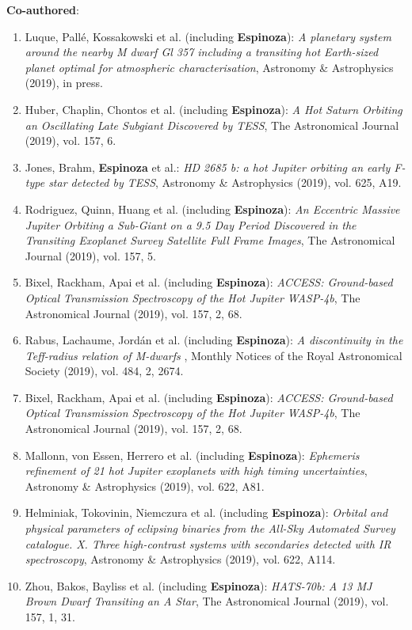 \documentclass[12pt, a4paper]{article} %
\begin{document}
\begin{flushleft}
\textbf{Co-authored}:
\begin{enumerate}
\setlength\itemsep{0.05cm}
\item Luque, Pall\'e, Kossakowski et al. (including \textbf{Espinoza}): \textit{A planetary system around the nearby M dwarf Gl 357 including a transiting hot Earth-sized planet optimal for atmospheric characterisation}, Astronomy \& Astrophysics (2019), in press.
\item Huber, Chaplin, Chontos et al. (including \textbf{Espinoza}): \textit{A Hot Saturn Orbiting an Oscillating Late Subgiant Discovered by TESS}, The Astronomical Journal (2019), vol. 157, 6.
\item Jones, Brahm, \textbf{Espinoza} et al.: \textit{HD 2685 b: a hot Jupiter orbiting an early F-type star detected by TESS}, Astronomy \& Astrophysics (2019), vol. 625, A19.
\item Rodriguez, Quinn, Huang et al. (including \textbf{Espinoza}): \textit{An Eccentric Massive Jupiter Orbiting a Sub-Giant on a 9.5 Day Period Discovered in the Transiting Exoplanet Survey Satellite Full Frame Images}, The Astronomical Journal (2019), vol. 157, 5.
\item Bixel, Rackham, Apai et al. (including \textbf{Espinoza}): \textit{ACCESS: Ground-based Optical Transmission Spectroscopy of the Hot Jupiter WASP-4b}, The Astronomical Journal (2019), vol. 157, 2, 68.
\item Rabus, Lachaume, Jord\'an et al. (including \textbf{Espinoza}): \textit{A discontinuity in the Teff-radius relation of M-dwarfs
}, Monthly Notices of the Royal Astronomical Society (2019), vol. 484, 2, 2674.
\item Bixel, Rackham, Apai et al. (including \textbf{Espinoza}): \textit{ACCESS: Ground-based Optical Transmission Spectroscopy of the Hot Jupiter WASP-4b}, The Astronomical Journal (2019), vol. 157, 2, 68.
\item Mallonn, von Essen, Herrero et al. (including \textbf{Espinoza}): \textit{Ephemeris refinement of 21 hot Jupiter exoplanets with high timing uncertainties}, Astronomy \& Astrophysics (2019), vol. 622, A81.
\item Helminiak, Tokovinin, Niemczura et al. (including \textbf{Espinoza}): \textit{Orbital and physical parameters of eclipsing binaries from the All-Sky Automated Survey catalogue. X. Three high-contrast systems with secondaries detected with IR spectroscopy}, Astronomy \& Astrophysics (2019), vol. 622, A114.
\item Zhou, Bakos, Bayliss et al. (including \textbf{Espinoza}): \textit{HATS-70b: A 13 MJ Brown Dwarf Transiting an A Star}, The Astronomical Journal (2019), vol. 157, 1, 31.

\end{enumerate}
\end{flushleft}
\end{document}
